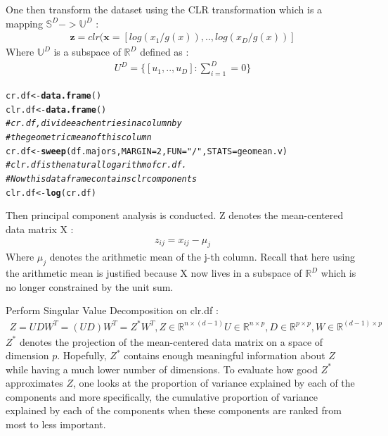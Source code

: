 \documentclass[a4paper,oneside,12pt,titlepage]{article}\usepackage[]{graphicx}\usepackage[]{color}
\makeatletter
\newcommand{\hlnum}[1]{\textcolor[rgb]{0.686,0.059,0.569}{#1}}%
\newcommand{\hlstr}[1]{\textcolor[rgb]{0.192,0.494,0.8}{#1}}%
\newcommand{\hlcom}[1]{\textcolor[rgb]{0.678,0.584,0.686}{\textit{#1}}}%
\newcommand{\hlstd}[1]{\textcolor[rgb]{0.345,0.345,0.345}{#1}}%
\newcommand{\hlkwb}[1]{\textcolor[rgb]{0.69,0.353,0.396}{#1}}%
\newcommand{\hlkwc}[1]{\textcolor[rgb]{0.333,0.667,0.333}{#1}}%
\newcommand{\hlkwd}[1]{\textcolor[rgb]{0.737,0.353,0.396}{\textbf{#1}}}%
\newenvironment{kframe}{%
 \def\at@end@of@kframe{}%
 \ifinner\ifhmode%
  \def\at@end@of@kframe{\end{minipage}}%
  \begin{minipage}{\columnwidth}%
 \fi\fi%
 \def\FrameCommand##1{\hskip\@totalleftmargin \hskip-\fboxsep
 \colorbox{shadecolor}{##1}\hskip-\fboxsep
     \hskip-\linewidth \hskip-\@totalleftmargin \hskip\columnwidth}%
 \MakeFramed {\advance\hsize-\width
   \@totalleftmargin\z@ \linewidth\hsize
   \@setminipage}}%
 {\par\unskip\endMakeFramed%
 \at@end@of@kframe}
\newenvironment{knitrout}{}{} %
\makeatother
\begin{document}
\noindent One then transform the dataset using the CLR transformation which is a mapping  $\mathbb{S}^D -> \mathbb{U}^D$ :
\begin{align}
\mathbf{z} = clr(\mathbf{x} = [log(x_1/g(x)),..,log(x_D/g(x))]
\end{align}
Where $\mathbb{U}^D$ is a subspace of $\mathbb{R}^D$ defined as : 
\begin{align*}
U^D = \Big\{[u_1,..,u_D] : \sum_{i=1}^D = 0  \Big\}
\end{align*}

\begin{knitrout}
\color{fgcolor}\begin{kframe}
\begin{alltt}
\hlstd{cr.df} \hlkwb{<-} \hlkwd{data.frame}\hlstd{()}
\hlstd{clr.df} \hlkwb{<-} \hlkwd{data.frame}\hlstd{()}
\hlcom{# cr.df, divide each entries in a column by }
\hlcom{# the geometric mean of this column}
\hlstd{cr.df} \hlkwb{<-} \hlkwd{sweep}\hlstd{(df.majors,}\hlkwc{MARGIN} \hlstd{=} \hlnum{2}\hlstd{,}\hlkwc{FUN}\hlstd{=}\hlstr{"/"}\hlstd{,}\hlkwc{STATS} \hlstd{= geomean.v)}
\hlcom{# clr.df is the natural logarithm of cr.df. }
\hlcom{# Now this dataframe contains clr components}
\hlstd{clr.df} \hlkwb{<-} \hlkwd{log}\hlstd{(cr.df)}
\end{alltt}
\end{kframe}
\end{knitrout}
Then principal component analysis is conducted.
Z denotes the mean-centered data matrix X :  
\begin{align*}
z_{ij} = x_{ij} - \mu_j
\end{align*}
Where $\mu_j$ denotes the arithmetic mean of the j-th column. Recall that here using the arithmetic mean is justified because X now lives in a subspace of $\mathbb{R}^D$ which is no longer constrained by the unit sum.

Perform Singular Value Decomposition on clr.df : 
\begin{align}
Z = UDW^T  = (UD)W^T = Z^{*}W^T,Z \in \mathbb{R}^{n\times(d-1)} U \in \mathbb{R}^{n\times p}, D \in \mathbb{R}^{p\times p}, W \in \mathbb{R}^{(d-1)\times p}
\end{align}
$Z^*$ denotes the projection of the mean-centered data matrix on a space of dimension $p$. Hopefully, $Z^*$ contains enough meaningful information about $Z$ while having a much lower number of dimensions. To evaluate how good $Z^*$ approximates $Z$, one looks at the proportion of variance explained by each of the components and more specifically, the cumulative proportion of variance explained by each of the components when these components are ranked from most to less important.
\end{document}
